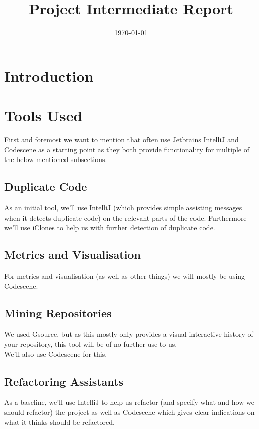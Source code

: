 \documentclass{article}
\title{\textmd{\textbf{Project Intermediate Report}}\\\normalsize\vspace{0.1in}\Large{\projectnaam}}
\author{\student}\date{\today}
\begin{document}
\maketitle
\newpage

\section{Introduction}

\section{Tools Used}

First and foremost we want to mention that often use Jetbrains IntelliJ and Codescene as a starting point as they both provide functionality for multiple of the below mentioned subsections.

\subsection{Duplicate Code}

As an initial tool, we'll use IntelliJ (which provides simple assisting messages when it detects duplicate code) on the relevant parts of the code. Furthermore we'll use iClones to help us with further detection of duplicate code.

\subsection{Metrics and Visualisation}

For metrics and visualisation (as well as other things) we will mostly be using Codescene.

\subsection{Mining Repositories}

We used Gsource, but as this mostly only provides a visual interactive history of your repository, this tool will be of no further use to us.\\

\noindent
We'll also use Codescene for this.

\subsection{Refactoring Assistants}

As a baseline, we'll use IntelliJ to help us refactor (and specify what and how we should refactor) the project as well as Codescene which gives clear indications on what it thinks should be refactored.
\end{document}
